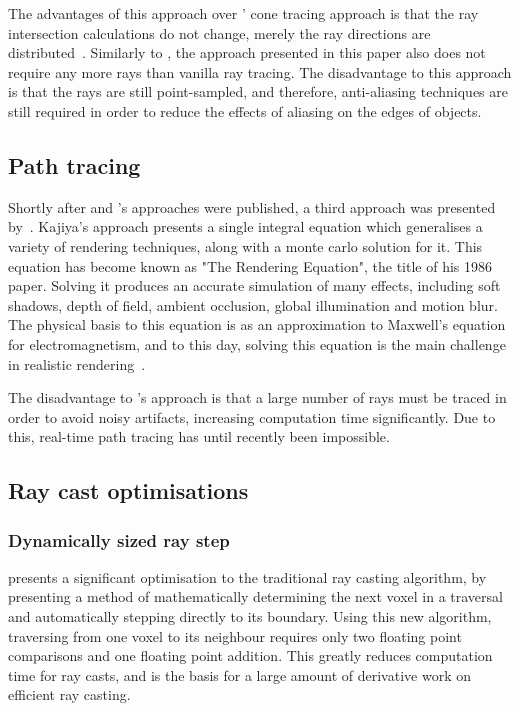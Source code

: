 The advantages of this approach over \citeauthor{amanatides84conetracing}' cone tracing approach is that the ray intersection calculations do not change, merely the ray directions are distributed~\parencite{cook84distributed}. Similarly to \cite{amanatides84conetracing}, the approach presented in this paper also does not require any more rays than vanilla ray tracing. The disadvantage to this approach is that the rays are still point-sampled, and therefore, anti-aliasing techniques are still required in order to reduce the effects of aliasing on the edges of objects.

\subsection{Path tracing}
Shortly after \citeauthor{amanatides84conetracing} and \citeauthor{cook84distributed}'s approaches were published, a third approach was presented by~\cite{kajiya86therendering}. Kajiya's approach presents a single integral equation which generalises a variety of rendering techniques, along with a monte carlo solution for it. This equation has become known as "The Rendering Equation", the title of his 1986 paper. Solving it produces an accurate simulation of many effects, including soft shadows, depth of field, ambient occlusion, global illumination and motion blur. The physical basis to this equation is as an approximation to Maxwell's equation for electromagnetism, and to this day, solving this equation is the main challenge in realistic rendering~\parencite{dimov07numericalmethods}.

The disadvantage to \citeauthor{kajiya86therendering}'s approach is that a large number of rays must be traced in order to avoid noisy artifacts, increasing computation time significantly. Due to this, real-time path tracing has until recently been impossible.

\subsection{Ray cast optimisations}

\subsubsection{Dynamically sized ray step}
\cite{amanatides87afast} presents a significant optimisation to the traditional ray casting algorithm, by presenting a method of mathematically determining the next voxel in a traversal and automatically stepping directly to its boundary. Using this new algorithm, traversing from one voxel to its neighbour requires only two floating point comparisons and one floating point addition. This greatly reduces computation time for ray casts, and is the basis for a large amount of derivative work on efficient ray casting.

